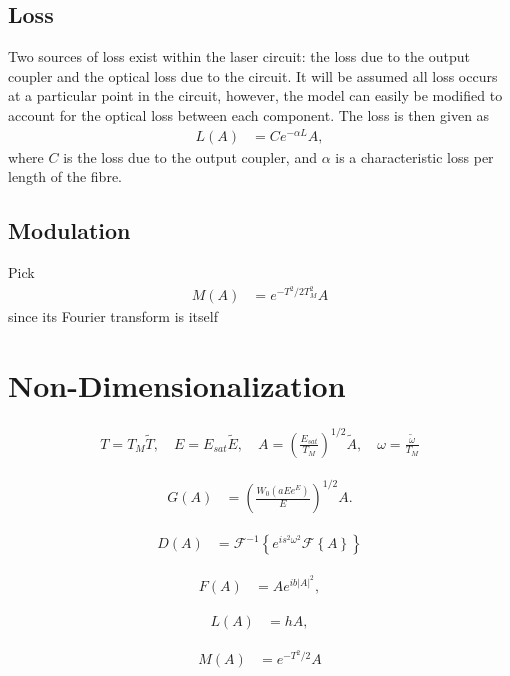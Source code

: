 \documentclass[12pt]{article}
\newcommand{\Es}{E_{sat}}
\newcommand{\FT}[1]{\mathcal{F}\left\{ #1 \right\}}
\newcommand{\FTi}[1]{\mathcal{F}^{-1}\left\{ #1 \right\}}
\begin{document}
\subsection{Loss}
Two sources of loss exist within the laser circuit: the loss due to the output coupler and the optical loss due to the circuit. It will be assumed all loss occurs at a particular point in the circuit, however, the model can easily be modified to account for the optical loss between each component. The loss is then given as
\begin{align*}
L(A) &= C e^{- \alpha L}A,
\end{align*}
where $C$ is the loss due to the output coupler, and $\alpha$ is a characteristic loss per length of the fibre.

\subsection{Modulation}
Pick
\begin{align*}
M(A) &= e^{-T^2 / 2 T_M^2} A
\end{align*}
since its Fourier transform is itself

\section{Non-Dimensionalization}

\begin{align*}
T = T_M \widetilde{T}, \quad E = \Es \widetilde{E}, \quad A = \left( \frac{\Es}{T_M} \right)^{1/2} \widetilde{A}, \quad \omega = \frac{\widetilde{\omega}}{T_M}
\end{align*}

\begin{align*}
G(A) &= \left( \frac{W_0 \left( a E e^{E}\right)}{E} \right)^{1/2} A.
\end{align*}

\begin{align*}
D(A) &= \FTi{e^{i s^2 \omega^2} \FT{A}}
\end{align*}

\begin{align*}
F(A) &= A e^{i b |A|^2},
\end{align*}

\begin{align*}
L(A) &= h A,
\end{align*}

\begin{align*}
M(A) &= e^{-T^2 / 2} A
\end{align*}
\end{document}
